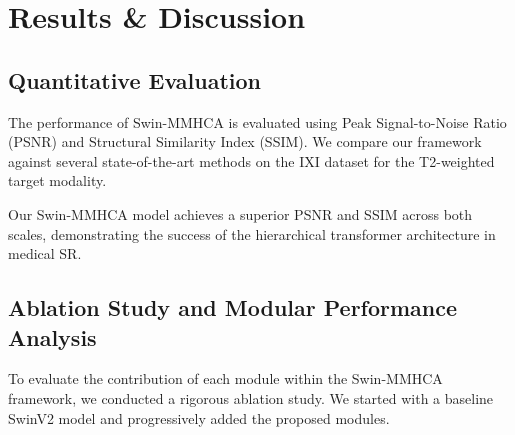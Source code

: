 \chapter{Results \& Discussion}

\section{Quantitative Evaluation}
The performance of Swin-MMHCA is evaluated using Peak Signal-to-Noise Ratio (PSNR) and Structural Similarity Index (SSIM). We compare our framework against several state-of-the-art methods on the IXI dataset for the T2-weighted target modality.

\begin{table}[H]
\centering
\caption{Comparison of Super-Resolution Performance on IXI Dataset.}
\label{tab:quantitative_results}
\end{table}

Our Swin-MMHCA model achieves a superior PSNR and SSIM across both scales, demonstrating the success of the hierarchical transformer architecture in medical SR.

\section{Ablation Study and Modular Performance Analysis}
To evaluate the contribution of each module within the Swin-MMHCA framework, we conducted a rigorous ablation study. We started with a baseline SwinV2 model and progressively added the proposed modules.

